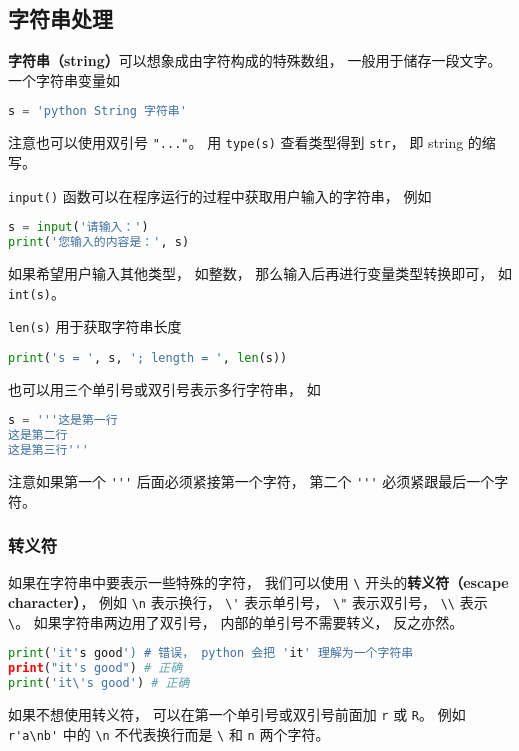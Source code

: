 

\subsection{字符串处理}
\textbf{字符串（string）}可以想象成由字符构成的特殊数组， 一般用于储存一段文字。 一个字符串变量如
\begin{lstlisting}[language=python]
s = 'python String 字符串'
\end{lstlisting}
注意也可以使用双引号 \verb`"..."`。 用 \verb`type(s)` 查看类型得到 \verb`str`， 即 string 的缩写。

\verb`input()` 函数可以在程序运行的过程中获取用户输入的字符串， 例如
\begin{lstlisting}[language=python]
s = input('请输入：')
print('您输入的内容是：', s)
\end{lstlisting}
如果希望用户输入其他类型， 如整数， 那么输入后再进行变量类型转换即可， 如 \verb`int(s)`。

\verb`len(s)` 用于获取字符串长度
\begin{lstlisting}[language=python]
print('s = ', s, '; length = ', len(s))
\end{lstlisting}
也可以用三个单引号或双引号表示多行字符串， 如
\begin{lstlisting}[language=python]
s = '''这是第一行
这是第二行
这是第三行'''
\end{lstlisting}
注意如果第一个 \verb`'''` 后面必须紧接第一个字符， 第二个 \verb`'''` 必须紧跟最后一个字符。

\subsubsection{转义符}
如果在字符串中要表示一些特殊的字符， 我们可以使用 \verb`\` 开头的\textbf{转义符（escape character）}， 例如 \verb`\n` 表示换行， \verb`\'` 表示单引号， \verb`\"` 表示双引号， \verb`\\` 表示 \verb`\`。 如果字符串两边用了双引号， 内部的单引号不需要转义， 反之亦然。
\begin{lstlisting}[language=python]
print('it's good') # 错误， python 会把 'it' 理解为一个字符串
print("it's good") # 正确
print('it\'s good') # 正确
\end{lstlisting}

如果不想使用转义符， 可以在第一个单引号或双引号前面加 \verb`r` 或 \verb`R`。 例如 \verb`r'a\nb'` 中的 \verb`\n` 不代表换行而是 \verb`\` 和 \verb`n` 两个字符。

